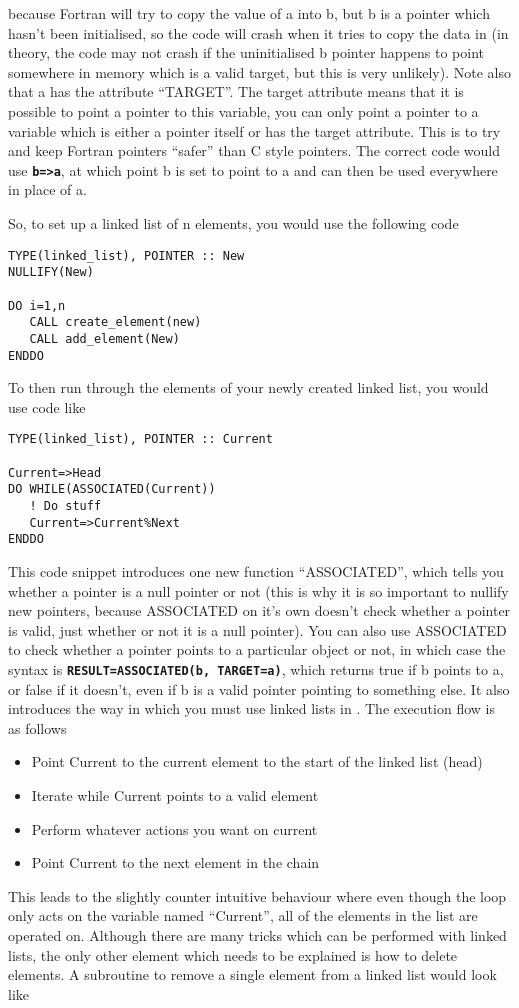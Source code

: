 \documentclass[12pt,a4paper]{article}
\newcommand{\simpleboxverbatim}{\begin{Verbatim}[obeytabs=true,frame=single,
  framerule=0.5mm,rulecolor=\color{warwickmid},formatcom=\color{black}]}
\newcommand{\inlinecode}[1]{{\color{warwickred} \bf\texttt{#1}}}
\newcommand{\EPOCH}{{\color{warwickdark}\fontfamily{phv}\selectfont{EPOCH}}}
\begin{document}
because Fortran will try to copy the value of a into b, but b is a pointer
which hasn't been initialised, so the code will crash when it tries to copy
the data in (in theory, the code may not crash if the uninitialised b pointer
happens to point somewhere in memory which is a valid target, but this is very
unlikely). Note also that a has the attribute ``TARGET''. The target attribute
means that it is possible to point a pointer to this variable, you can only
point a pointer to a variable which is either a pointer itself or has the
target attribute. This is to try and keep Fortran pointers ``safer'' than C
style pointers. The correct code would use \inlinecode{b=>a}, at which point b
is set to point to a and can then be used everywhere in place of a.

So, to set up a linked list of n elements, you would use the following code

\simpleboxverbatim
TYPE(linked_list), POINTER :: New
NULLIFY(New)

DO i=1,n
   CALL create_element(new)
   CALL add_element(New)
ENDDO
\end{Verbatim}

To then run through the elements of your newly created linked list, you would
use code like
\simpleboxverbatim
TYPE(linked_list), POINTER :: Current

Current=>Head
DO WHILE(ASSOCIATED(Current))
   ! Do stuff
   Current=>Current%
ENDDO
\end{Verbatim}

This code snippet introduces one new function ``ASSOCIATED'', which tells you
whether a pointer is a null pointer or not (this is why it is so important to
nullify new pointers, because ASSOCIATED on it's own doesn't check whether a
pointer is valid, just whether or not it is a null pointer). You can also use
ASSOCIATED to check whether a pointer points to a particular object or not, in
which case the syntax is \inlinecode{RESULT=ASSOCIATED(b, TARGET=a)}, which
returns true if b points to a, or false if it doesn't, even if b is a valid
pointer pointing to something else. It also introduces the way in which you
must use linked lists in \EPOCH. The execution flow is as follows
\begin{itemize}
\item Point Current to the current element to the start of the linked list
  (head)
\item Iterate while Current points to a valid element
\item Perform whatever actions you want on current
\item Point Current to the next element in the chain
\end{itemize}
This leads to the slightly counter intuitive behaviour where even though the
loop only acts on the variable named ``Current'', all of the elements in the
list are operated on. Although there are many tricks which can be performed
with linked lists, the only other element which needs to be explained is how
to delete elements. A subroutine to remove a single element from a linked list
would look like
\end{document}
